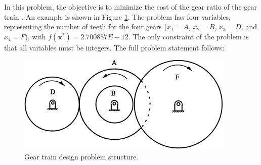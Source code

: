 
In this problem, the objective is to minimize the cost of the gear ratio of the gear train \citep{PV}. An example is shown in Figure \ref{fig:GT}. The problem has four variables, representing the number of teeth for the four gears ($x_1 = A$, $x_2 = B$, $x_3 = D$, and $x_4 = F$), with $f(\bm{x}^*) = 2.700857E \! - \! 12$. The only constraint of the problem is that all variables must be integers. The full problem statement follows:

\vspace{-0.5cm}



\vspace{0.5cm}


\begin{figure}[h]
    \begin{center}
    \includegraphics[scale=0.6]{img/Problems/GT.jpg}
    \end{center}
    \captionsetup{justification=centering}
    \caption{Gear train design problem structure.}\label{fig:GT}
\end{figure}
